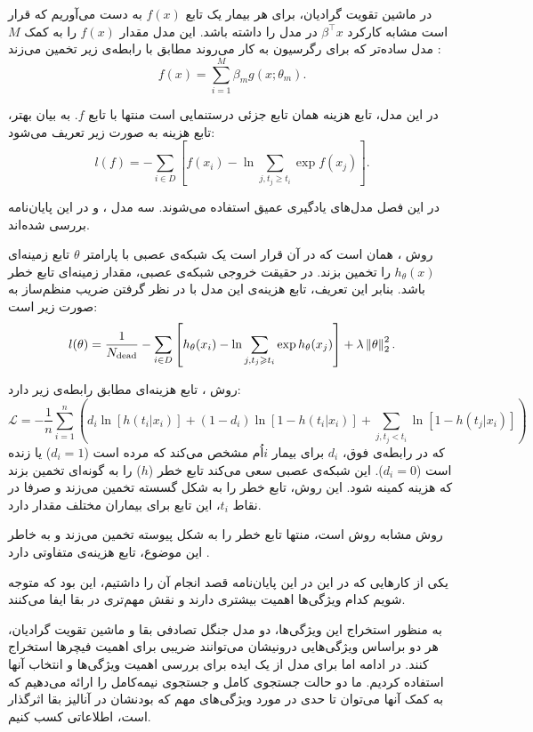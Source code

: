 در ماشین تقویت گرادیان، برای هر بیمار یک تابع $f(x)$ به دست می‌آوریم که قرار است مشابه کارکرد $\beta^\intercal x$ در مدل  را داشته باشد. این مدل مقدار $f(x)$ را به کمک $M$ مدل ساده‌تر که برای رگرسیون به کار می‌روند مطابق با رابطه‌ی زیر تخمین می‌زند :
$$f(x) = \sum_{i=1}^M \beta_m g(x; \theta_m).$$

در این مدل، تابع هزینه همان تابع جزئی درستنمایی  است منتها با تابع $f$. به بیان بهتر، تابع هزینه به صورت زیر تعریف می‌شود:
$$l(f) = -
\sum_{i \in D}\left[
f(x_i) - \ln{\sum_{j, t_j\geq t_i} \exp{f(x_j)}}
\right].$$

در این فصل مدل‌های یادگیری عمیق استفاده می‌شوند. سه مدل
،
و
در این پایان‌نامه بررسی شده‌اند.

روش ، همان  است که در آن قرار است یک شبکه‌ی عصبی با پارامتر $\theta$ تابع زمینه‌ای
$h_\theta(x)$
را تخمین بزند. در حقیقت خروجی شبکه‌ی عصبی، مقدار زمینه‌ای تابع خطر باشد. بنابر این تعریف، تابع هزینه‌ی این مدل با در نظر گرفتن ضریب منظم‌ساز  به صورت زیر است:
$$l(\theta) = 
\frac{1}{N_{\text{dead}}}
 -\sum_{i \in D}\left[
h_\theta(x_i) - \ln{\sum_{j, t_j\geqslant t_i} \exp{h_\theta(x_j)}}
\right] + \lambda \left\lVert\theta\right\rVert_{2}^{2}.
$$

روش ، تابع هزینه‌ای مطابق رابطه‌ی زیر دارد:
$$\mathcal{L} = -\frac{1}{n} \sum_{i=1}^{n} 
\left(d_i \ln{\left[
	h(t_i | x_i)\right]} + 
(1 - d_i) \ln{\left[
	1-h(t_i|x_i)\right]}+
\sum_{j, t_j < t_i} \ln{\left[
	1-h(t_j|x_i)\right]}
\right)
$$
که در رابطه‌ی فوق، $d_i$ برای بیمار $i$اُم مشخص می‌کند که مرده است ($d_i=1$) یا زنده است ($d_i=0$). این شبکه‌ی عصبی سعی می‌کند تابع خطر ($h$) را به گونه‌ای تخمین بزند که هزینه کمینه شود. این روش، تابع خطر را به شکل گسسته تخمین می‌زند و صرفا در نقاط $t_i$، این تابع برای بیماران مختلف مقدار دارد.

روش  مشابه روش  است، منتها تابع خطر را به شکل پیوسته تخمین می‌زند و به خاطر این موضوع، تابع هزینه‌ی متفاوتی دارد .



یکی از کارهایی که در این در این پایان‌نامه قصد انجام آن را داشتیم، این بود که متوجه شویم کدام ویژگی‌ها اهمیت بیشتری دارند و نقش مهم‌تری در بقا ایفا می‌کنند.

به منظور استخراج این ویژگی‌ها، دو مدل جنگل تصادفی بقا و ماشین تقویت گرادیان، هر دو براساس ویژگی‌هایی درونیشان می‌توانند ضریبی برای اهمیت فیچرها استخراج کنند. در ادامه اما برای مدل  از یک ایده برای بررسی اهمیت ویژگی‌ها و انتخاب آنها استفاده کردیم. ما دو حالت جستجوی کامل و جستجوی نیمه‌کامل  را ارائه می‌دهیم که به کمک آنها می‌توان تا حدی در مورد ویژگی‌های مهم که بودنشان در آنالیز بقا اثرگذار است، اطلاعاتی کسب کنیم.

